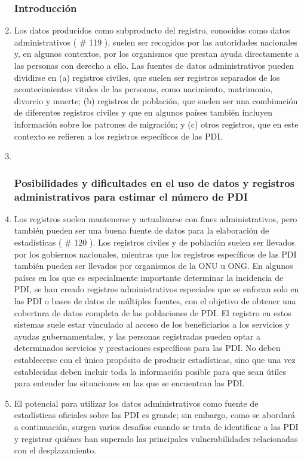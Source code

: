 \documentclass[
]{book}
\begin{document}
\begin{enumerate}
{  \subsubsection{Introducción}\label{introducciuxf3n-7}}
\item
  Los datos producidos como subproducto del registro, conocidos como datos administrativos (
  \# 119
  ), suelen ser recogidos por las autoridades nacionales y, en algunos contextos, por los organismos que prestan ayuda directamente a las personas con derecho a ello. Las fuentes de datos administrativos pueden dividirse en (a) registros civiles, que suelen ser registros separados de los acontecimientos vitales de las personas, como nacimiento, matrimonio, divorcio y muerte; (b) registros de población, que suelen ser una combinación de diferentes registros civiles y que en algunos países también incluyen información sobre los patrones de migración; y (c) otros registros, que en este contexto se refieren a los registros específicos de las PDI.
\item ~
  \hypertarget{posibilidades-y-dificultades-en-el-uso-de-datos-y-registros-administrativos-para-estimar-el-nuxfamero-de-pdi}{%
  \subsubsection{Posibilidades y dificultades en el uso de datos y registros administrativos para estimar el número de PDI}\label{posibilidades-y-dificultades-en-el-uso-de-datos-y-registros-administrativos-para-estimar-el-nuxfamero-de-pdi}}
\item
  Los registros suelen mantenerse y actualizarse con fines administrativos, pero también pueden ser una buena fuente de datos para la elaboración de estadísticas (
  \# 120
  ). Los registros civiles y de población suelen ser llevados por los gobiernos nacionales, mientras que los registros específicos de las PDI también pueden ser llevados por organismos de la ONU u ONG. En algunos países en los que es especialmente importante determinar la incidencia de PDI, se han creado registros administrativos especiales que se enfocan solo en las PDI o bases de datos de múltiples fuentes, con el objetivo de obtener una cobertura de datos completa de las poblaciones de PDI. El registro en estos sistemas suele estar vinculado al acceso de los beneficiarios a los servicios y ayudas gubernamentales, y las personas registradas pueden optar a determinados servicios y prestaciones específicos para las PDI. No deben establecerse con el único propósito de producir estadísticas, sino que una vez establecidas deben incluir toda la información posible para que sean útiles para entender las situaciones en las que se encuentran las PDI.
\item
  El potencial para utilizar los datos administrativos como fuente de estadísticas oficiales sobre las PDI es grande; sin embargo, como se abordará a continuación, surgen varios desafíos cuando se trata de identificar a las PDI y registrar quiénes han superado las principales vulnerabilidades relacionadas con el desplazamiento.


\end{enumerate}
\end{document}
